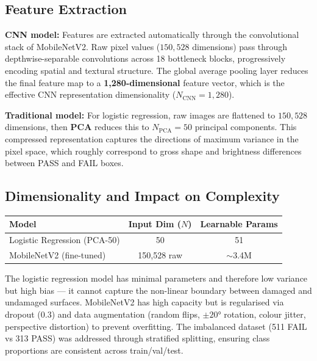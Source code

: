 \documentclass[10pt,twocolumn]{article}
\begin{document}
\subsection*{Feature Extraction}

\textbf{CNN model:} Features are extracted automatically through the convolutional stack of MobileNetV2. Raw pixel values ($150{,}528$ dimensions) pass through depthwise-separable convolutions across 18 bottleneck blocks, progressively encoding spatial and textural structure. The global average pooling layer reduces the final feature map to a \textbf{1,280-dimensional} feature vector, which is the effective CNN representation dimensionality ($N_{\text{CNN}} = 1{,}280$).

\textbf{Traditional model:} For logistic regression, raw images are flattened to $150{,}528$ dimensions, then \textbf{PCA} reduces this to $N_{\text{PCA}} = 50$ principal components. This compressed representation captures the directions of maximum variance in the pixel space, which roughly correspond to gross shape and brightness differences between PASS and FAIL boxes.

\subsection*{Dimensionality and Impact on Complexity}

\begin{center}
\small
\begin{tabular}{lcc}
\toprule
\textbf{Model} & \textbf{Input Dim ($N$)} & \textbf{Learnable Params} \\
\midrule
Logistic Regression (PCA-50) & 50          & 51 \\
MobileNetV2 (fine-tuned)      & 150,528 raw & $\sim$3.4M \\
\bottomrule
\end{tabular}
\end{center}

The logistic regression model has minimal parameters and therefore low variance but high bias --- it cannot capture the non-linear boundary between damaged and undamaged surfaces. MobileNetV2 has high capacity but is regularised via dropout (0.3) and data augmentation (random flips, $\pm20°$ rotation, colour jitter, perspective distortion) to prevent overfitting. The imbalanced dataset (511 FAIL vs 313 PASS) was addressed through stratified splitting, ensuring class proportions are consistent across train/val/test.

\end{document}
